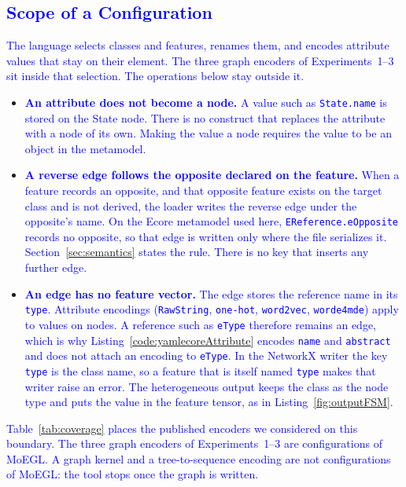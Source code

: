 \documentclass[journal,article,submit,moreauthors,technologies]{Definitions/mdpi}
\newcommand{\rev}[1]{\textcolor{blue}{#1}}
\begin{document}
\subsection{\rev{Scope of a Configuration}}\label{sec:limits}
\rev{The language selects classes and features, renames them, and encodes attribute values that stay on their element. The three graph encoders of Experiments~1--3 sit inside that selection. The operations below stay outside it.}
\begin{itemize}
    \item \rev{\textbf{An attribute does not become a node.} A value such as \texttt{State.name} is stored on the State node. There is no construct that replaces the attribute with a node of its own. Making the value a node requires the value to be an object in the metamodel.}
    \item \rev{\textbf{A reverse edge follows the opposite declared on the feature.} When a feature records an opposite, and that opposite feature exists on the target class and is not derived, the loader writes the reverse edge under the opposite's name. On the Ecore metamodel used here, \texttt{EReference.eOpposite} records no opposite, so that edge is written only where the file serializes it. Section~\ref{sec:semantics} states the rule. There is no key that inserts any further edge.}
    \item \rev{\textbf{An edge has no feature vector.} The edge stores the reference name in its \texttt{type}. Attribute encodings (\texttt{RawString}, \texttt{one-hot}, \texttt{word2vec}, \texttt{worde4mde}) apply to values on nodes. A reference such as \texttt{eType} therefore remains an edge, which is why Listing~\ref{code:yamlecoreAttribute} encodes \texttt{name} and \texttt{abstract} and does not attach an encoding to \texttt{eType}. In the NetworkX writer the key \texttt{type} is the class name, so a feature that is itself named \texttt{type} makes that writer raise an error. The heterogeneous output keeps the class as the node type and puts the value in the feature tensor, as in Listing~\ref{fig:outputFSM}.}
\end{itemize}
\rev{Table~\ref{tab:coverage} places the published encoders we considered on this boundary. The three graph encoders of Experiments~1--3 are configurations of MoEGL. A graph kernel and a tree-to-sequence encoding are not configurations of MoEGL: the tool stops once the graph is written.}
\end{document}
